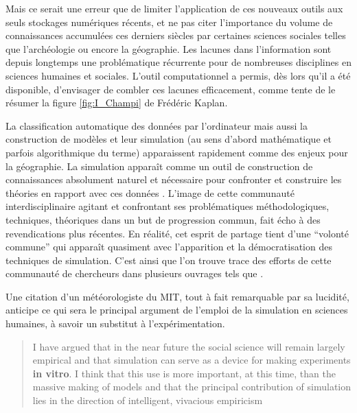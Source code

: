 Mais ce serait une erreur que de limiter l'application de ces nouveaux outils aux seuls stockages numériques récents, et ne pas citer l'importance du volume de connaissances accumulées ces derniers siècles par certaines sciences sociales telles que l'archéologie ou encore la géographie. Les lacunes dans l'information sont depuis longtemps une problématique récurrente pour de nombreuses disciplines en sciences humaines et sociales. L'outil computationnel a permis, dès lors qu'il a été disponible, d'envisager de combler ces lacunes efficacement, comme tente de le résumer la figure \ref{fig:I_Champi}  de Frédéric Kaplan.


La classification automatique des données par l'ordinateur mais aussi la construction de modèles et leur simulation (au sens d'abord mathématique et parfois algorithmique du terme) apparaissent rapidement comme des enjeux pour la géographie. La simulation apparaît comme un outil de construction de connaissances absolument naturel et nécessaire pour confronter et construire les théories en rapport avec ces données \autocites{Kao1963, Hagerstrand1967b}. L'image de cette communauté interdisciplinaire agitant et confrontant ses problématiques méthodologiques, techniques, théoriques dans un but de progression commun, fait écho à des revendications plus récentes. En réalité, cet esprit de partage tient d'une \enquote{volonté commune} qui apparaît quasiment avec l'apparition et la démocratisation des techniques de simulation. C'est ainsi que l'on trouve trace des efforts de cette communauté de chercheurs dans plusieurs ouvrages tels que \autocites{Borko1962,Beshers1965,Naylor1966,Dutton1971,Guetzkow1962,Guetzkow1972}.

Une citation d'un météorologiste du MIT, tout à fait remarquable par sa lucidité, anticipe ce qui sera le principal argument de l'emploi de la simulation en sciences humaines, à savoir un substitut à l'expérimentation.

\foreignblockquote{english}[\cite{Fleisher1965}]{I have argued that in the near future the social science will remain largely empirical and that simulation can serve as a device for making experiments \textbf{in vitro}. I think that this use is more important, at this time, than the massive making of models and that the principal contribution of simulation lies in the direction of intelligent, vivacious empiricism}

